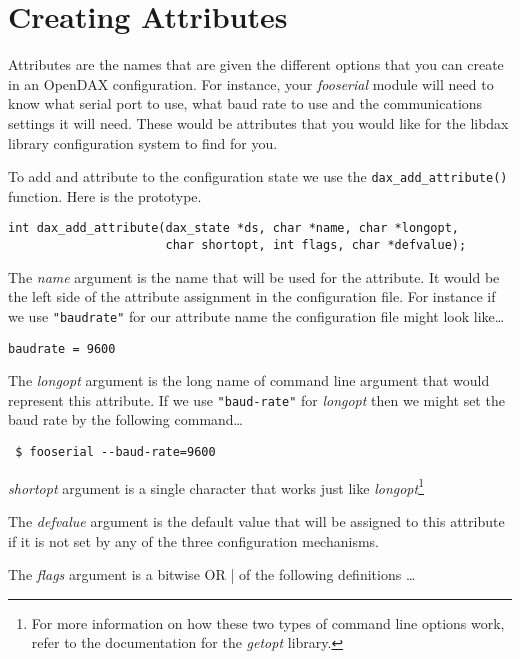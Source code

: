 \section{Creating Attributes} Attributes are the names that
are given the different options that you can create in an OpenDAX configuration.
For instance, your \textit{fooserial} module will need to know what serial port
to use, what baud rate to use and the communications settings it will need.
These would be attributes that you would like for the libdax library
configuration system to find for you.

To add and attribute to the configuration state we use the
\verb|dax_add_attribute()| function.  Here
is the prototype.

\begin{verbatim}
int dax_add_attribute(dax_state *ds, char *name, char *longopt,
                      char shortopt, int flags, char *defvalue);
\end{verbatim}

The \textit{name} argument is the name that will be used for the attribute.  It
would be the left side of the attribute assignment in the configuration file.
For instance if we use \texttt{"baudrate"} for our attribute name the
configuration file might look like\ldots

\begin{verbatim}
baudrate = 9600
\end{verbatim}

The \textit{longopt} argument is the long name of command line argument that
would represent this attribute.  If we use \texttt{"baud-rate"} for
\textit{longopt} then we might set the baud rate by the following command\ldots

\begin{verbatim} $ fooserial --baud-rate=9600 \end{verbatim} %
\textit{shortopt} argument is a single character that works just like
\textit{longopt}\footnote{For more information on how these two types of command
line options work, refer to the documentation for the \textit{getopt} library.}

The \textit{defvalue} argument is the default value that will be assigned to
this attribute if it is not set by any of the three configuration mechanisms.

The \textit{flags} argument is a bitwise OR {|} of the following definitions
\ldots

